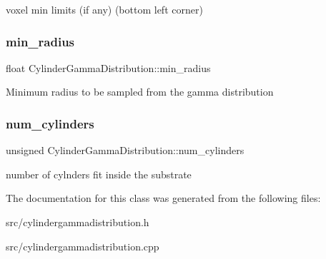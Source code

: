 voxel min limits (if any) (bottom left corner) \mbox{\label{class_cylinder_gamma_distribution_aece7d3ec40d3dbb3a2ecd1bd88c5a694}} 
\subsubsection{\texorpdfstring{min\+\_\+radius}{min\_radius}}
{\footnotesize\ttfamily float Cylinder\+Gamma\+Distribution\+::min\+\_\+radius}

Minimum radius to be sampled from the gamma distribution \mbox{\label{class_cylinder_gamma_distribution_af74583662a4f33ba1565f2c71e6bbc5a}} 
\subsubsection{\texorpdfstring{num\+\_\+cylinders}{num\_cylinders}}
{\footnotesize\ttfamily unsigned Cylinder\+Gamma\+Distribution\+::num\+\_\+cylinders}

number of cylnders fit inside the substrate 

The documentation for this class was generated from the following files\+:\begin{DoxyCompactItemize}
\item 
src/cylindergammadistribution.\+h\item 
src/cylindergammadistribution.\+cpp\end{DoxyCompactItemize}
